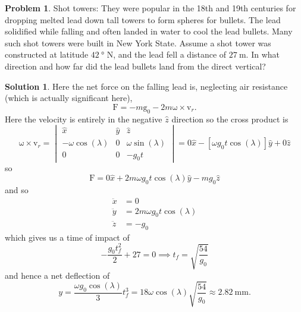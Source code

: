 \documentclass[10pt]{article}
\theoremstyle{definition}
\newtheorem{problem}{Problem}
\newtheorem{soln}{Solution}
\newcommand{\ux}{\hat{x}}
\newcommand{\uy}{\hat{y}}
\newcommand{\uz}{\hat{z}}
\newcommand{\bv}[1]{\bm{\mathrm{#1}}}
\begin{document}
\begin{problem} Shot towers: They were popular in the 18th and 19th centuries for dropping melted lead down
tall towers to form spheres for bullets. The lead solidified while falling and often landed in water
to cool the lead bullets. Many such shot towers were built in New York State. Assume a shot
tower was constructed at latitude $\qty{42}{\degree}$ N, and the lead fell a distance of $\qty{27}{\meter}$. In what direction and
how far did the lead bullets land from the direct vertical?
\end{problem}
\begin{soln}
  Here the net force on the falling lead is, neglecting air resistance (which is actually significant here),
  $$\bv{F}=-m\bv{g}_0-2m\bv{\omega}\times\bv{v}_r.$$
  Here the velocity is entirely in the negative $\uz$ direction so the cross product is
  $$\bv{\omega}\times\bv{v}_r=\begin{vmatrix}
      \ux                  & \uy & \uz                 \\
      -\omega\cos(\lambda) & 0   & \omega\sin(\lambda) \\
      0                    & 0   & -g_0t
    \end{vmatrix}=
    0\ux-[\omega g_0 t\cos(\lambda)]\uy+0\uz$$
  so
  $$\bv{F}=0\ux+2m\omega g_0 t\cos(\lambda)\uy-mg_0\uz$$
  and so
  \begin{align*}
    \ddot{x} & =0                           \\
    \ddot{y} & =2m\omega g_0 t\cos(\lambda) \\
    \ddot{z} & =-g_0
  \end{align*}
  which gives us a time of impact of
  $$-\frac{g_0t_f^2}{2}+27=0\implies t_f=\sqrt{\frac{54}{g_0}}$$
  and hence a net deflection of
  $$y=\frac{\omega g_0\cos(\lambda)}{3} t_f^3=18\omega\cos(\lambda)\sqrt{\frac{54}{g_0}}\approx \qty{2.82}{\milli\meter}.$$
\end{soln}
\end{document}
